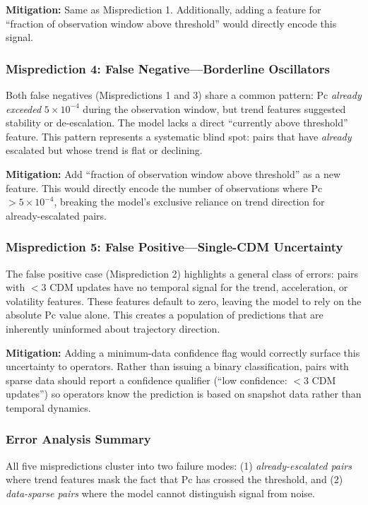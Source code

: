 \documentclass{article}
\begin{document}
\textbf{Mitigation:} Same as Misprediction 1. Additionally, adding a feature for ``fraction of observation window above threshold'' would directly encode this signal.

\subsubsection{Misprediction 4: False Negative---Borderline Oscillators}

Both false negatives (Mispredictions 1 and 3) share a common pattern: Pc \emph{already exceeded} $5 \times 10^{-4}$ during the observation window, but trend features suggested stability or de-escalation. The model lacks a direct ``currently above threshold'' feature. This pattern represents a systematic blind spot: pairs that have \emph{already} escalated but whose trend is flat or declining.

\textbf{Mitigation:} Add ``fraction of observation window above threshold'' as a new feature. This would directly encode the number of observations where Pc $> 5 \times 10^{-4}$, breaking the model's exclusive reliance on trend direction for already-escalated pairs.

\subsubsection{Misprediction 5: False Positive---Single-CDM Uncertainty}

The false positive case (Misprediction 2) highlights a general class of errors: pairs with $< 3$ CDM updates have no temporal signal for the trend, acceleration, or volatility features. These features default to zero, leaving the model to rely on the absolute Pc value alone. This creates a population of predictions that are inherently uninformed about trajectory direction.

\textbf{Mitigation:} Adding a minimum-data confidence flag would correctly surface this uncertainty to operators. Rather than issuing a binary classification, pairs with sparse data should report a confidence qualifier (``low confidence: $< 3$ CDM updates'') so operators know the prediction is based on snapshot data rather than temporal dynamics.

\subsubsection{Error Analysis Summary}

All five mispredictions cluster into two failure modes: (1) \emph{already-escalated pairs} where trend features mask the fact that Pc has crossed the threshold, and (2) \emph{data-sparse pairs} where the model cannot distinguish signal from noise.
\end{document}
